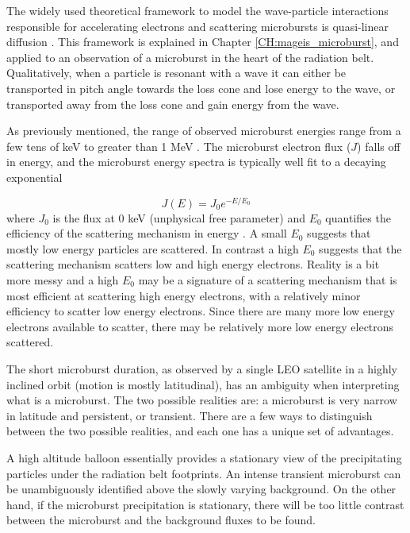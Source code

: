 The widely used theoretical framework to model the wave-particle interactions responsible for accelerating electrons and scattering microbursts is quasi-linear diffusion \citep[e.g.][]{Walker1993, Summers1998, Meredith2002, Horne2005, Thorne2005, Summers2005}. This framework is explained in Chapter \ref{CH:mageis_microburst}, and applied to an observation of a microburst in the heart of the radiation belt. Qualitatively, when a particle is resonant with a wave it can either be transported in pitch angle towards the loss cone and lose energy to the wave, or transported away from the loss cone and gain energy from the wave.

As previously mentioned, the range of observed microburst energies range from a few tens of keV \citep[e.g][]{Datta1997, Parks1967} to greater than 1 MeV \citep[e.g.][]{Blake1996, Greeley2019}. The microburst electron flux ($J$) falls off in energy, and the microburst energy spectra is typically well fit to a decaying exponential 

\begin{equation}
J(E) = J_0 e^{-E/E_0}
\end{equation} where $J_0$ is the flux at 0 keV (unphysical free parameter) and $E_0$ quantifies the efficiency of the scattering mechanism in energy \citep[e.g.][]{Parks1967, Datta1997, Lee2005}. A small $E_0$ suggests that mostly low energy particles are scattered. In contrast a high $E_0$ suggests that the scattering mechanism scatters low and high energy electrons. Reality is a bit more messy and a high $E_0$ may be a signature of a scattering mechanism that is most efficient at scattering high energy electrons, with a relatively minor efficiency to scatter low energy electrons. Since there are many more low energy electrons available to scatter, there may be relatively more low energy electrons scattered.

The short microburst duration, as observed by a single LEO satellite in a highly inclined orbit (motion is mostly latitudinal), has an ambiguity when interpreting what is a microburst. The two possible realities are: a microburst is very narrow in latitude and persistent, or transient. There are a few ways to distinguish between the two possible realities, and each one has a unique set of advantages.

A high altitude balloon essentially provides a stationary view of the precipitating particles under the radiation belt footprints. An intense transient microburst can be unambiguously identified above the slowly varying background. On the other hand, if the microburst precipitation is stationary, there will be too little contrast between the microburst and the background fluxes to be found.

